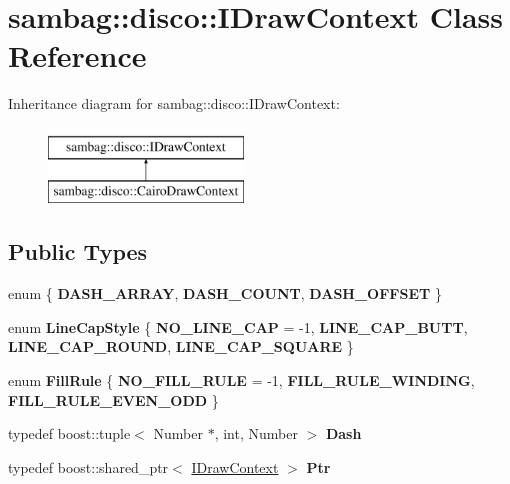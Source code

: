 \hypertarget{classsambag_1_1disco_1_1_i_draw_context}{
\section{sambag::disco::IDrawContext Class Reference}
\label{classsambag_1_1disco_1_1_i_draw_context}
}
Inheritance diagram for sambag::disco::IDrawContext:\begin{figure}[H]
\begin{center}
\leavevmode
\includegraphics[height=2.000000cm]{classsambag_1_1disco_1_1_i_draw_context}
\end{center}
\end{figure}
\subsection*{Public Types}
\begin{DoxyCompactItemize}
\item 
enum \{ {\bfseries DASH\_\-ARRAY}, 
{\bfseries DASH\_\-COUNT}, 
{\bfseries DASH\_\-OFFSET}
 \}
\item 
enum {\bfseries LineCapStyle} \{ {\bfseries NO\_\-LINE\_\-CAP} =  -\/1, 
{\bfseries LINE\_\-CAP\_\-BUTT}, 
{\bfseries LINE\_\-CAP\_\-ROUND}, 
{\bfseries LINE\_\-CAP\_\-SQUARE}
 \}
\item 
enum {\bfseries FillRule} \{ {\bfseries NO\_\-FILL\_\-RULE} =  -\/1, 
{\bfseries FILL\_\-RULE\_\-WINDING}, 
{\bfseries FILL\_\-RULE\_\-EVEN\_\-ODD}
 \}
\item 
\hypertarget{classsambag_1_1disco_1_1_i_draw_context_a3d48fedddfad7a1cfc39215c8a818d13}{
typedef boost::tuple$<$ Number $\ast$, int, Number $>$ {\bfseries Dash}}
\label{classsambag_1_1disco_1_1_i_draw_context_a3d48fedddfad7a1cfc39215c8a818d13}

\item 
\hypertarget{classsambag_1_1disco_1_1_i_draw_context_ad80ce08b17efe735486eed67e9705615}{
typedef boost::shared\_\-ptr$<$ \hyperlink{classsambag_1_1disco_1_1_i_draw_context}{IDrawContext} $>$ {\bfseries Ptr}}
\label{classsambag_1_1disco_1_1_i_draw_context_ad80ce08b17efe735486eed67e9705615}

\end{DoxyCompactItemize}
